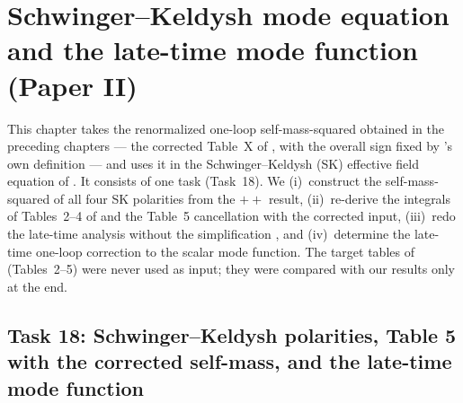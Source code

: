 \providecommand{\chixDk}{\mathcal{D}_k}
\providecommand{\chixR}{\mathcal{R}}

\chapter{Schwinger--Keldysh mode equation and the late-time mode function (Paper II)}
\label{ch:sk}

This chapter takes the renormalized one-loop self-mass-squared obtained in the preceding chapters ---
the corrected Table~X of \PI, with the overall sign fixed by \PI's own definition  --- and
uses it in the Schwinger--Keldysh (SK) effective field equation of \PII. It consists of one task
(Task~18). We
(i)~construct the self-mass-squared of all four SK polarities from the $++$ result,
(ii)~re-derive the integrals of Tables~2--4 of \PII{} and the Table~5 cancellation with the corrected input,
(iii)~redo the late-time analysis without the simplification , and
(iv)~determine the late-time one-loop correction to the scalar mode function.
The target tables of \PII{} (Tables~2--5) were never used as input; they were compared with our results only at the end.

\section{Task 18: Schwinger--Keldysh polarities, Table 5 with the corrected self-mass, and the late-time mode function}
\label{sec:task18}

